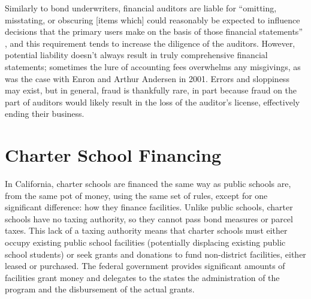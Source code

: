 Similarly to bond underwriters, financial auditors are liable for ``omitting, misstating, or obscuring [items which] could reasonably be expected to influence decisions that the primary users make on the basis of those financial statements'' \parencite{Cayamanda2020}, and this requirement tends to increase the diligence of the auditors. However, potential liability doesn't always result in truly comprehensive financial statements; sometimes the lure of accounting fees overwhelms any misgivings, as was the case with Enron and Arthur Andersen in 2001. Errors and sloppiness may exist, but in general, fraud is thankfully rare, in part because fraud on the part of auditors would likely result in the loss of the auditor's license, effectively ending their business. 

\section{Charter School Financing}\label{sec:charter-school-financing}\indent

In California, charter schools are financed the same way as public schools are, from the same pot of money, using the same set of rules, except for one significant difference: how they finance facilities. Unlike public schools, charter schools have no taxing authority, so they cannot pass bond measures or parcel taxes. This lack of a taxing authority means that charter schools must either occupy existing public school facilities (potentially displacing existing public school students) or seek grants and donations to fund non-district facilities, either leased or purchased. The federal government provides significant amounts of facilities grant money and delegates to the states the administration of the program and the disbursement of the actual grants. 

